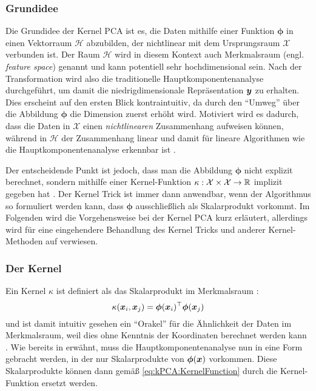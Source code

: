 \subsubsection{Grundidee}
\label{ch:MethodenDerDimRed:statistisch:kPCA:Grundidee}

Die Grundidee der Kernel PCA ist es, die Daten mithilfe einer Funktion $\bm{\phi}$ in einen
Vektorraum $\mathcal{H}$ abzubilden, der nichtlinear mit dem Ursprungsraum $\mathcal{X}$ verbunden
ist. Der Raum $\mathcal{H}$ wird in diesem Kontext auch Merkmalsraum (engl. \textit{feature space})
genannt und kann potentiell sehr hochdimensional sein. Nach der Transformation wird also die
traditionelle Hauptkomponentenanalyse durchgeführt, um damit die niedrigdimensionale Repräsentation
$\bm{y}$ zu erhalten. Dies erscheint auf den ersten Blick kontraintuitiv, da durch den
\enquote{Umweg} über die Abbildung $\bm{\phi}$ die Dimension zuerst erhöht wird. Motiviert wird es
dadurch, dass die Daten in $\mathcal{X}$ einen \textit{nichtlinearen} Zusammenhang aufweisen
können, während in $\mathcal{H}$ der Zusammenhang linear und damit für lineare Algorithmen wie die
Hauptkomponentenanalyse erkennbar ist \parencite[vgl.][26]{ShaweTaylor.2011}.

Der entscheidende Punkt ist jedoch, dass man die Abbildung $\bm{\phi}$ nicht explizit berechnet,
sondern mithilfe einer Kernel-Funktion $\kappa: \mathcal{X} \times \mathcal{X} \rightarrow \mathbb{R}$
implizit gegeben hat \parencites[586 -- 588]{Bishop.2006}[583]{Scholkopf.1997}. Der Kernel Trick ist immer dann anwendbar,
wenn der Algorithmus so formuliert werden kann, dass $\bm{\phi}$ ausschließlich als Skalarprodukt
vorkommt. Im Folgenden wird die Vorgehensweise bei der Kernel PCA kurz erläutert, allerdings wird
für eine eingehendere Behandlung des Kernel Tricks und anderer Kernel-Methoden auf
\textcite{ShaweTaylor.2011} verwiesen.

\subsubsection{Der Kernel}
\label{ch:MethodenDerDimRed:statistisch:kPCA:KernelFunktion}

Ein Kernel $\kappa$ ist definiert als das Skalarprodukt im Merkmalsraum \parencite[34]{ShaweTaylor.2011}:
\begin{equation}
	\label{eq:kPCA:KernelFunction}
	\kappa(\bm{x}_i, \bm{x}_j) = \bm{\phi}(\bm{x}_i)^\top \bm{\phi}(\bm{x}_j)
\end{equation}
und ist damit intuitiv gesehen ein \enquote{Orakel} für die Ähnlichkeit der Daten im Merkmalsraum, weil dies ohne Kenntnis der Koordinaten berechnet werden kann \parencite[71]{ShaweTaylor.2011}. Wie bereits in
 erwähnt, muss die
Hauptkomponentenanalyse nun in eine Form gebracht werden, in der nur Skalarprodukte von
$\bm{\phi}(\bm{x})$ vorkommen. Diese Skalarprodukte können dann gemäß
\eqref{eq:kPCA:KernelFunction} durch die Kernel-Funktion ersetzt werden.

